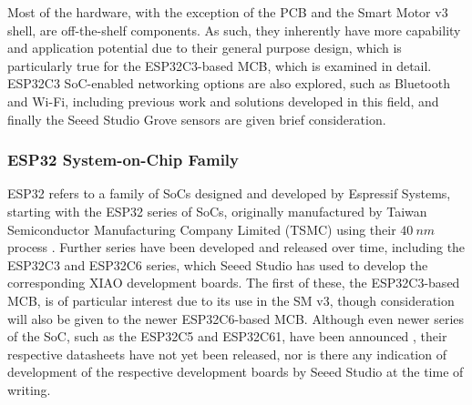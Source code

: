  Most of the hardware, with the exception of the PCB and the Smart Motor v3 shell, are off-the-shelf components. As such, they inherently have more capability and application potential due to their general purpose design, which is particularly true for the ESP32C3-based MCB, which is examined in detail. ESP32C3 SoC-enabled networking options are also explored, such as Bluetooth and Wi-Fi, including previous work and solutions developed in this field, and finally the Seeed Studio Grove sensors are given brief consideration.

\subsubsection{\label{sec:rev_esp}ESP32 System-on-Chip Family}

ESP32 refers to a family of SoCs designed and developed by Espressif Systems, starting with the ESP32 series of SoCs, originally manufactured by Taiwan Semiconductor Manufacturing Company Limited (TSMC) using their $40\ nm$ process \citep{espressif_systems_esp32_2025}.
Further series have been developed and released over time, including the ESP32C3 and ESP32C6 series, which Seeed Studio has used to develop the corresponding XIAO development boards. The first of these, the ESP32C3-based MCB, is of particular interest due to its use in the SM v3, though consideration will also be given to the newer ESP32C6-based MCB. Although even newer series of the SoC, such as the ESP32C5 and ESP32C61, have been announced \citep{espressif_systems_esp_nodate}, their respective datasheets have not yet been released, nor is there any indication of development of the respective development boards by Seeed Studio at the time of writing.\\


